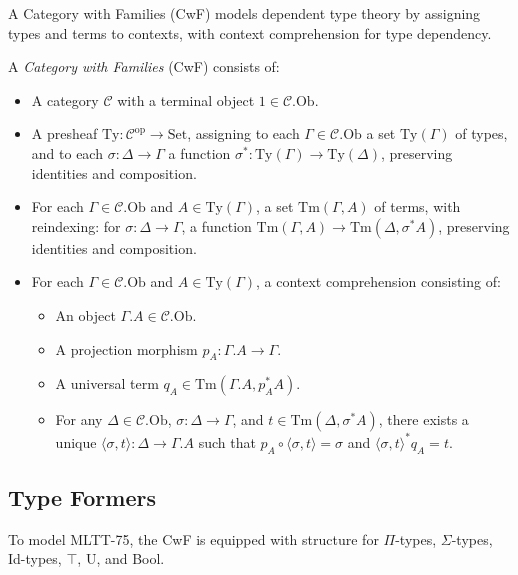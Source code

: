 \documentclass{article}
\begin{document}
A Category with Families (CwF) models dependent type theory by assigning types and terms to contexts, with context comprehension for type dependency.

\newpage
\begin{definition}
A \emph{Category with Families} (CwF) consists of:
\begin{itemize}
  \item A category $\mathcal{C}$ with a terminal object $1 \in \mathcal{C}.\text{Ob}$.
  \item A presheaf $\text{Ty} : \mathcal{C}^{\text{op}} \to \text{Set}$, assigning to each $\Gamma \in \mathcal{C}.\text{Ob}$ a set $\text{Ty}(\Gamma)$ of types, and to each $\sigma : \Delta \to \Gamma$ a function $\sigma^* : \text{Ty}(\Gamma) \to \text{Ty}(\Delta)$, preserving identities and composition.
  \item For each $\Gamma \in \mathcal{C}.\text{Ob}$ and $A \in \text{Ty}(\Gamma)$, a set $\text{Tm}(\Gamma, A)$ of terms, with reindexing: for $\sigma : \Delta \to \Gamma$, a function $\text{Tm}(\Gamma, A) \to \text{Tm}(\Delta, \sigma^* A)$, preserving identities and composition.
  \item For each $\Gamma \in \mathcal{C}.\text{Ob}$ and $A \in \text{Ty}(\Gamma)$, a context comprehension consisting of:
    \begin{itemize}
      \item An object $\Gamma.A \in \mathcal{C}.\text{Ob}$.
      \item A projection morphism $p_A : \Gamma.A \to \Gamma$.
      \item A universal term $q_A \in \text{Tm}(\Gamma.A, p_A^* A)$.
      \item For any $\Delta \in \mathcal{C}.\text{Ob}$, $\sigma : \Delta \to \Gamma$, and $t \in \text{Tm}(\Delta, \sigma^* A)$, there exists a unique $\langle \sigma, t \rangle : \Delta \to \Gamma.A$ such that $p_A \circ \langle \sigma, t \rangle = \sigma$ and $\langle \sigma, t \rangle^* q_A = t$.
    \end{itemize}
\end{itemize}
\end{definition}

\subsection{Type Formers}
To model MLTT-75, the CwF is equipped with structure for $\Pi$-types, $\Sigma$-types, Id-types, $\top$, U, and Bool.
\end{document}
